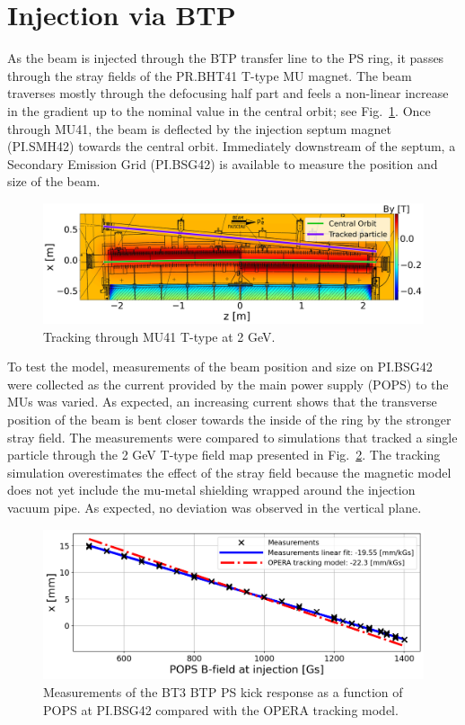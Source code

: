 \documentclass[a4paper,
               biblatex,     %
               keeplastbox,   %
               ]{jacow}
\begin{document}
\section{Injection via BTP}
As the beam is injected through the BTP transfer line to the PS ring, it passes through the stray fields of the PR.BHT41 T-type MU magnet. The beam traverses mostly through the defocusing half part and feels a non-linear increase in the gradient up to the nominal value in the central orbit; see Fig.~\ref{fig:injection_btp}. Once through MU41, the beam is deflected by the injection septum magnet (PI.SMH42) towards the central orbit. Immediately downstream of the septum, a Secondary Emission Grid (PI.BSG42) is available to measure the position and size of the beam.

\begin{figure}[!htb]
   \centering
   \includegraphics*[width=1.0\columnwidth]{MOPOTK030_f5.png}
   \caption{Tracking through MU41 T-type at 2 GeV.}
   \label{fig:injection_btp}
\end{figure}

To test the model, measurements of the beam position and size on PI.BSG42 were collected as the current provided by the main power supply (POPS) to the MUs was varied. As expected, an increasing current shows that the transverse position of the beam is bent closer towards the inside of the ring by the stronger stray field. The measurements were compared to simulations that tracked a single particle through the 2 GeV T-type field map presented in Fig.~\ref{fig:injection_btp_transverse_position}. The tracking simulation overestimates the effect of the stray field because the magnetic model does not yet include the mu-metal shielding wrapped around the injection vacuum pipe. As expected, no deviation was observed in the vertical plane.

\begin{figure}[!htb]
   \centering
   \includegraphics*[width=1.0\columnwidth]{transverse_position_vs_POPS.png}
   \caption{Measurements of the BT3 BTP PS kick response as a function of POPS at PI.BSG42 compared with the OPERA tracking model.}
   \label{fig:injection_btp_transverse_position}
\end{figure}
\end{document}
